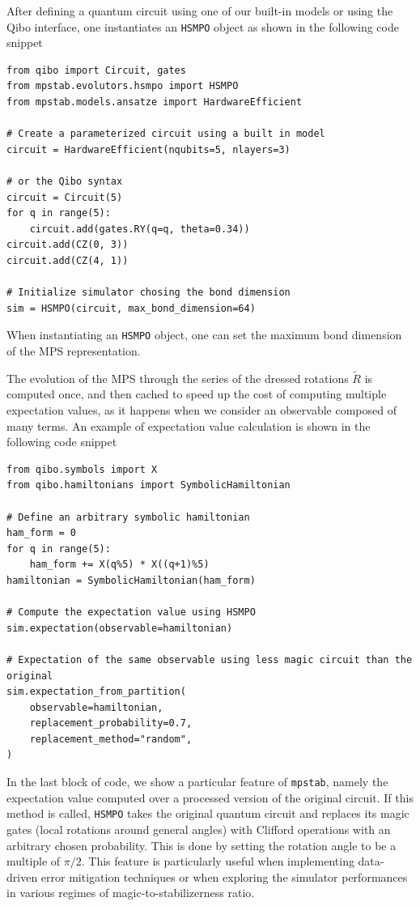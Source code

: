 \documentclass[pra,aps,twocolumn,longbibliography,preprintnumbers,superscriptaddress,nofootnotebib,10pt]{revtex4-2}
\begin{document}
After defining a quantum circuit using one of our built-in models or using the Qibo interface, one instantiates an 
\texttt{HSMPO} object as shown in the following code snippet
\vspace{0.3cm}
\begin{lstlisting}
from qibo import Circuit, gates
from mpstab.evolutors.hsmpo import HSMPO
from mpstab.models.ansatze import HardwareEfficient

# Create a parameterized circuit using a built in model
circuit = HardwareEfficient(nqubits=5, nlayers=3)

# or the Qibo syntax
circuit = Circuit(5)
for q in range(5):
    circuit.add(gates.RY(q=q, theta=0.34))
circuit.add(CZ(0, 3))
circuit.add(CZ(4, 1))

# Initialize simulator chosing the bond dimension
sim = HSMPO(circuit, max_bond_dimension=64)
\end{lstlisting}
\vspace{0.3cm}
When instantiating an \texttt{HSMPO} object, one can set the maximum bond dimension of the MPS representation. 


The evolution of the MPS through the series of the dressed rotations $\tilde{R}$ is computed once, and then cached to speed up the cost of computing multiple expectation values, as it happens when we consider an observable composed of many terms. An example of expectation value calculation is shown in the following code snippet
\vspace{0.3cm}
\begin{lstlisting}
from qibo.symbols import X
from qibo.hamiltonians import SymbolicHamiltonian 

# Define an arbitrary symbolic hamiltonian
ham_form = 0
for q in range(5):
    ham_form += X(q%5) * X((q+1)%5) 
hamiltonian = SymbolicHamiltonian(ham_form)

# Compute the expectation value using HSMPO
sim.expectation(observable=hamiltonian)

# Expectation of the same observable using less magic circuit than the original 
sim.expectation_from_partition(
    observable=hamiltonian,
    replacement_probability=0.7,
    replacement_method="random",
)
\end{lstlisting} 
\vspace{0.3cm}
In the last block of code, we show a particular feature of \texttt{mpstab}, namely the expectation value computed over a processed version of the original circuit. If this method is called, \texttt{HSMPO} takes the original quantum circuit and replaces its magic gates (local rotations around general angles) with Clifford operations with an arbitrary chosen probability. This is done by setting the rotation angle to be a multiple of $\pi/2$. This feature is particularly useful when implementing data-driven error mitigation techniques or when exploring the simulator performances in various regimes of magic-to-stabilizerness ratio.
\end{document}

